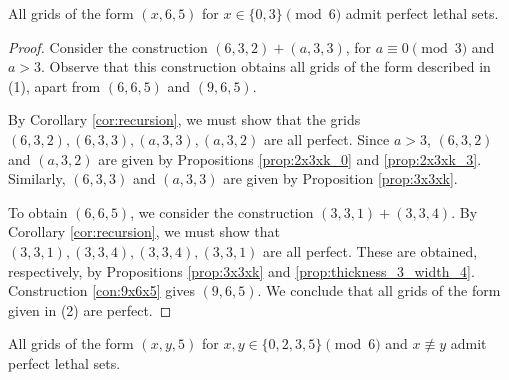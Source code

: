 \begin{lem}
\label{lem:thickness_5_case_2}
All grids of the form $(x,6,5)$ for $x \in \{0,3\} \pmod 6$ admit perfect lethal sets.
\end{lem}

\begin{proof}
Consider the construction $(6,3,2) + (a,3,3)$, for $a \equiv 0 \pmod 3$ and $a >3$. Observe that this construction obtains all grids of the form described in (1), apart from $(6,6,5)$ and $(9,6,5)$.

By Corollary \ref{cor:recursion}, we must show that the grids $(6,3,2), (6,3,3), (a,3,3), (a,3,2)$ are all perfect. Since $a >3$, $(6,3,2)$ and $(a,3,2)$ are given by Propositions \ref{prop:2x3xk_0} and \ref{prop:2x3xk_3}. Similarly, $(6,3,3)$ and $(a,3,3)$ are given by Proposition \ref{prop:3x3xk}.

To obtain $(6,6,5)$, we consider the construction $(3,3,1)+(3,3,4)$. By Corollary \ref{cor:recursion}, we must show that $(3,3,1), (3,3,4), (3,3,4), (3,3,1)$ are all perfect. These are obtained, respectively, by Propositions \ref{prop:3x3xk} and \ref{prop:thickness_3_width_4}. Construction \ref{con:9x6x5} gives $(9,6,5)$. We conclude that all grids of the form given in (2) are perfect.
\end{proof}

\begin{lem}
\label{lem:thickness_5_case_3}
All grids of the form $(x,y,5)$ for $x,y \in \{0,2,3,5\} \pmod 6$ and $x \not\equiv y$ admit perfect lethal sets.
\end{lem}

